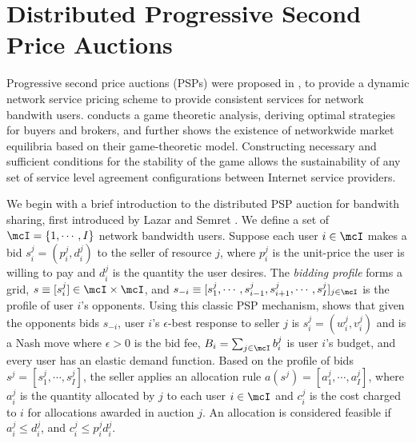 \section{Distributed Progressive Second Price Auctions}

Progressive second price auctions (PSPs) were proposed
in \cite{lazar}, \cite{diffserve} to provide a dynamic network service pricing
scheme to provide consistent services for network bandwith users.
\cite{diffserve} conducts a game theoretic analysis, deriving
optimal strategies for buyers and brokers, and further shows the existence
of networkwide market equilibria based on their game-theoretic
model. Constructing necessary and sufficient conditions for the stability
of the game allows the sustainability of any set
of service level agreement configurations between Internet service
providers.

We begin with a brief introduction to the distributed PSP auction for bandwith
sharing, first introduced by Lazar and Semret \cite{lazar}.
We define a set of $\mcI = \lbrace 1,\cdots,I\rbrace$ network bandwidth users.
Suppose each user $i \in \mcI$ makes a bid $s_i^j = (p_i^j, d_i^j)$ to the
seller of resource $j$, where $p_i^j$ is the unit-price the user is willing to
pay and $d_i^j$ is the quantity the user desires. The \emph{bidding profile} forms a grid, $s \equiv
[s_i^j] \in \mcI \times \mcI$, and $s_{-i} \equiv [s_1^j , \cdots , s_{i-1}^j , s_{i+1}^j , \cdots
, s_I^j]_{j\in\mcI}$ is the profile of user $i$'s opponents. 
Using this classic PSP mechanism, \cite{lazar} shows that given the opponents
bids $s_{-i}$,
user $i$'s $\epsilon$-best response to seller $j$ is $s_i^j = (w_i^j, v_i^j)$
and is a Nash move
where $\epsilon > 0$ is the bid fee, $B_i =\sum_{j\in\mcI} b_i^j$ is user $i$'s
budget, and every user has an elastic demand function.
Based on the profile of bids $s^j = [s^j_1, \cdots , s^j_I]$, the seller applies
an allocation rule $a(s^j) = [a_1^j, \cdots , a_I^j]$, where $a^j_i$ is the quantity allocated
by $j$ to each user $i\in\mcI$ and $c^j_i$ is the cost charged to $i$ for
allocations awarded in auction $j$. 
An allocation is considered feasible if $a^j_i \le d_i^j$, and $c^j_i \le  p^j_i d_i^j$.

